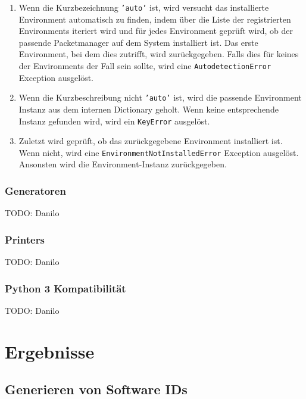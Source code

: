\begin{enumerate}
	\item Wenn die Kurzbezeichnung \texttt{'auto'} ist, wird versucht das
	installierte Environment automatisch zu finden, indem über die Liste der
	registrierten Environments iteriert wird und für jedes Environment geprüft
	wird, ob der passende Packetmanager auf dem System installiert ist. Das erste
	Environment, bei dem dies zutrifft, wird zurückgegeben. Falls dies für keines
	der Environments der Fall sein sollte, wird eine \texttt{AutodetectionError}
	Exception ausgelöst.
	
	\item Wenn die Kurzbeschreibung nicht \texttt{'auto'} ist, wird die passende
	Environment Instanz aus dem internen Dictionary geholt. Wenn keine
	entsprechende Instanz gefunden wird, wird ein \texttt{KeyError} ausgelöst.
		
	\item Zuletzt wird geprüft, ob das zurückgegebene Environment installiert
	ist. Wenn nicht, wird eine \texttt{EnvironmentNotInstalledError} Exception
	ausgelöst. Ansonsten wird die Environment-Instanz zurückgegeben.
\end{enumerate}

\subsubsection{Generatoren}
\label{swidgenerator:architektur:generatoren}
TODO: Danilo

\subsubsection{Printers}
\label{swidgenerator:architektur:printers}
TODO: Danilo

\subsubsection{Python 3 Kompatibilität}
TODO: Danilo



\section{Ergebnisse}

\subsection{Generieren von Software IDs}

